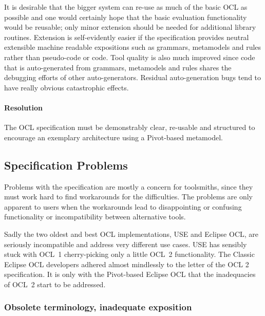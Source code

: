 \documentclass{jot}
\begin{document}
It is desirable that the bigger system can re-use as much of the basic OCL as possible and one would certainly hope that the basic evaluation functionality would be reusable; only minor extension should be needed for additional library routines. Extension is self-evidently easier if the specification provides  neutral extensible machine readable expositions such as grammars, metamodels and rules rather than pseudo-code or code. Tool quality is also much improved since code that is auto-generated from grammars, metamodels and rules shares the debugging efforts of other auto-generators. Residual auto-generation bugs tend to have really obvious catastrophic effects. 


\paragraph{Resolution}

The OCL specification must be demonstrably clear, re-usable and structured to encourage an exemplary architecture using a Pivot-based metamodel.

\subsection{Specification Problems}

Problems with the specification are mostly a concern for toolsmiths, since they must work hard to find workarounds for the difficulties. The problems are only apparent to users when the workarounds lead to disappointing or confusing functionality or incompatibility between alternative tools.

Sadly the two oldest and best OCL implementations, USE and Eclipse OCL, are seriously incompatible and address very different use cases. USE has sensibly stuck with OCL~1 cherry-picking only a little OCL~2 functionality. The Classic Eclipse OCL developers adhered almost mindlessly to the letter of the OCL 2 specification. It is only with the Pivot-based Eclipse OCL that the inadequacies of OCL~2 start to be addressed.

\subsubsection{Obsolete terminology, inadequate exposition}
\end{document}
